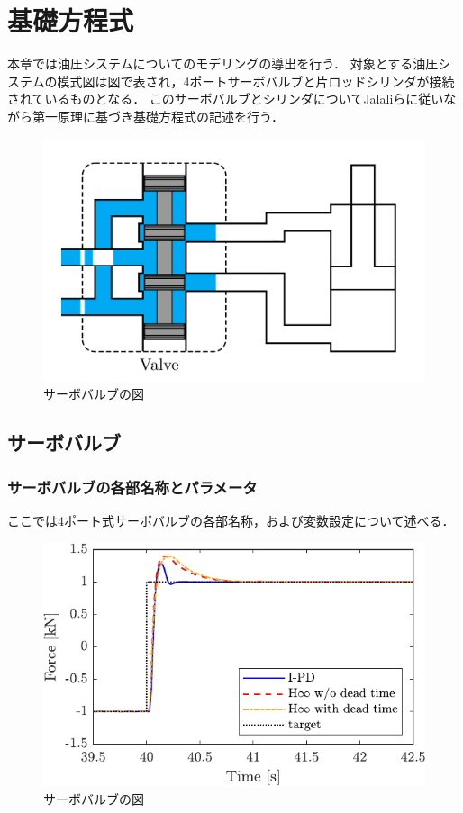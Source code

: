 \chapter{基礎方程式}
本章では油圧システムについてのモデリングの導出を行う．
対象とする油圧システムの模式図は図で表され，4ポートサーボバルブと片ロッドシリンダが接続されているものとなる．
このサーボバルブとシリンダについてJalaliらに従いながら第一原理に基づき基礎方程式の記述を行う．
\begin{figure}[t]
    \centering
        \includegraphics[keepaspectratio, scale=1.0]{contents/基礎方程式/figure/valve-cylinder.png}
        \caption{サーボバルブの図}
        \label{fig:figlabel}
\end{figure}

\section{サーボバルブ}
\subsection{サーボバルブの各部名称とパラメータ}
ここでは4ポート式サーボバルブの各部名称，および変数設定について述べる．
\begin{figure}[t]
    \centering
        \includegraphics[keepaspectratio, scale=1.0]{contents/基礎方程式/figure/crop-1115_diff_estforce_step.pdf}
        \caption{サーボバルブの図}
        \label{fig:figlabel}
\end{figure}

